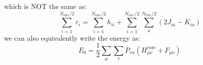 \documentclass[12pt]{article}
\begin{document}
which is NOT the same as:
\begin{equation}
    \sum_{i=1}^{N_\text{elec}/2} \varepsilon_i = \sum_{i=1}^{N_\text{elec}/2} h_{ii} + \sum_{i=1}^{N_\text{elec}/2} \sum_{a}^{N_\text{elec}/2} \left(2J_{ia} - K_{ia}\right) 
\end{equation}
we can also equivalently write the energy as:
\begin{equation}
    E_0=\frac{1}{2} \sum_\mu \sum_v P_{v u}\left(H_{\mu \nu}^{\mathrm{core}}+F_{\mu \nu}\right)
\end{equation}
\end{document}
